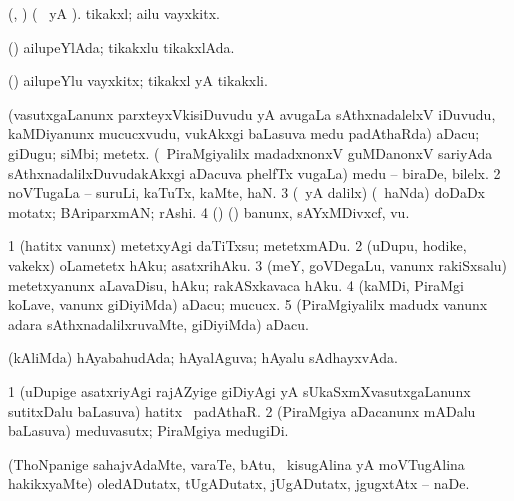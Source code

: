 \bentry
{} 
\gl{\nA}
\expl{}
\bmng
(\ame, \ashi) (\bava\  yA ). tikakxl; ailu vayxkitx. 
\emng
\eentry

\bentry
{} 
\gl{\gu}
\bmng
(\ashi) ailupeYlAda; tikakxlu tikakxlAda. 
\emng
\eentry

\bentry
{} 
\gl{\nA}
\bmng
(\ashi) ailupeYlu vayxkitx; tikakxl yA tikakxli. 
\emng
\eentry

\bentry
{} 
\gl{\nA}
\expl{}
\bmng
\bnum
{} 
\banum
{} (vasutxgaLanunx parxteyxVkisiDuvudu yA avugaLa sAthxnadalelxV iDuvudu, kaMDiyanunx mucucxvudu, \mo vukAkxgi baLasuva medu padAthaRda) aDacu; giDugu; siMbi; metetx. 
 (\kanmu\ PiraMgiyalilx madadxnonxV guMDanonxV sariyAda sAthxnadalilxDuvudakAkxgi aDacuva phelfTx \mo vugaLa) medu -- biraDe, bilelx. 
\eanum
\numie
\num{2} noVTugaLa -- suruLi, kaTuTx, kaMte, haN. 
\num{3} (\Eva\ yA \bava dalilx) (\kanmu\ haNda) doDaDx motatx; BAriparxmAN; rAshi. 
\num{4} (\birx) ({\ashi}) banunx, sAYxMDivxcf, \mo vu. 
\enum
\emng
\eentry

\bentry
{} 
\gl{\sakirx}
\bmng
\bnum
\num{1} (hatitx \mo vanunx) metetxyAgi daTiTxsu; metetxmADu. 
\num{2} (uDupu, hodike, \mo vakekx) oLametetx hAku; asatxrihAku. 
\num{3} (meY, goVDegaLu, \mo vanunx rakiSxsalu) metetxyanunx aLavaDisu, hAku; rakASxkavaca hAku. 
\num{4} (kaMDi, PiraMgi koLave, \mo vanunx giDiyiMda) aDacu; mucucx. 
\num{5} (PiraMgiyalilx madudx \mo vanunx adara sAthxnadalilxruvaMte, giDiyiMda) aDacu. 
\enum
\emng
\eentry

\bentry
{} 
\gl{\gu}
\expl{}
\bmng
(kAliMda) hAyabahudAda; hAyalAguva; hAyalu sAdhayxvAda. 
\emng
\eentry

\bentry
{} 
\gl{\nA}
\bmng
\bnum
\num{1} (uDupige asatxriyAgi rajAZyige giDiyAgi yA sUkaSxmXvasutxgaLanunx sutitxDalu baLasuva) hatitx \mo\ padAthaR. 
\num{2} (PiraMgiya aDacanunx mADalu baLasuva) meduvasutx; PiraMgiya medugiDi. 
\enum
\emng
\eentry

\bentry
{} 
\gl{\akirx}
\expl{}
\bmng
(ThoNpanige sahajvAdaMte, varaTe, bAtu, \mo\ kisugAlina yA moVTugAlina hakikxyaMte) oledADutatx, tUgADutatx, jUgADutatx, jgugxtAtx -- naDe. 
\emng
\eentry


